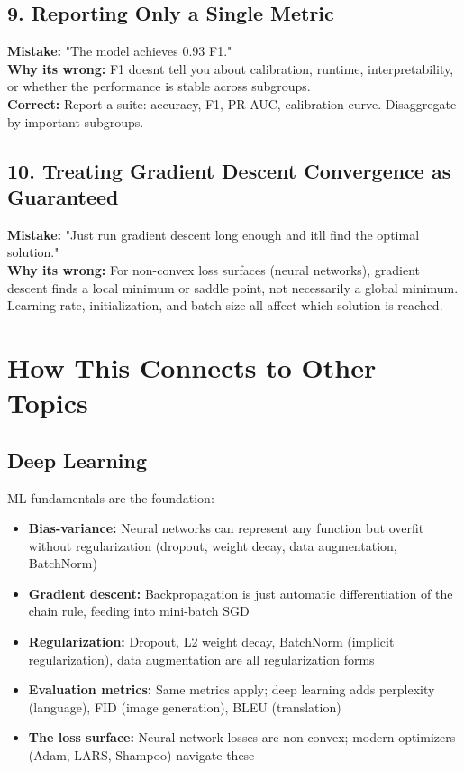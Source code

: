 \documentclass[11pt]{article}
\providecommand{\tightlist}{\setlength{\itemsep}{1pt}\setlength{\parskip}{0pt}}
\begin{document}
\subsection{9. Reporting Only a Single Metric}\label{9-reporting-only-a-single-metric}

\textbf{Mistake:} "The model achieves 0.93 F1."\\
\textbf{Why it\textquotesingle s wrong:} F1 doesn\textquotesingle t tell you about calibration, runtime, interpretability, or whether the performance is stable across subgroups.\\
\textbf{Correct:} Report a suite: accuracy, F1, PR-AUC, calibration curve. Disaggregate by important subgroups.

\subsection{10. Treating Gradient Descent Convergence as Guaranteed}\label{10-treating-gradient-descent-convergence-as-guaranteed}

\textbf{Mistake:} "Just run gradient descent long enough and it\textquotesingle ll find the optimal solution."\\
\textbf{Why it\textquotesingle s wrong:} For non-convex loss surfaces (neural networks), gradient descent finds a local minimum or saddle point, not necessarily a global minimum. Learning rate, initialization, and batch size all affect which solution is reached.

\section{How This Connects to Other Topics}\label{how-this-connects-to-other-topics}

\subsection{Deep Learning}\label{deep-learning}

ML fundamentals are the foundation:

\begin{itemize}
\tightlist
\item
  \textbf{Bias-variance:} Neural networks can represent any function but overfit without regularization (dropout, weight decay, data augmentation, BatchNorm)
\item
  \textbf{Gradient descent:} Backpropagation is just automatic differentiation of the chain rule, feeding into mini-batch SGD
\item
  \textbf{Regularization:} Dropout, L2 weight decay, BatchNorm (implicit regularization), data augmentation are all regularization forms
\item
  \textbf{Evaluation metrics:} Same metrics apply; deep learning adds perplexity (language), FID (image generation), BLEU (translation)
\item
  \textbf{The loss surface:} Neural network losses are non-convex; modern optimizers (Adam, LARS, Shampoo) navigate these
\end{itemize}
\end{document}
